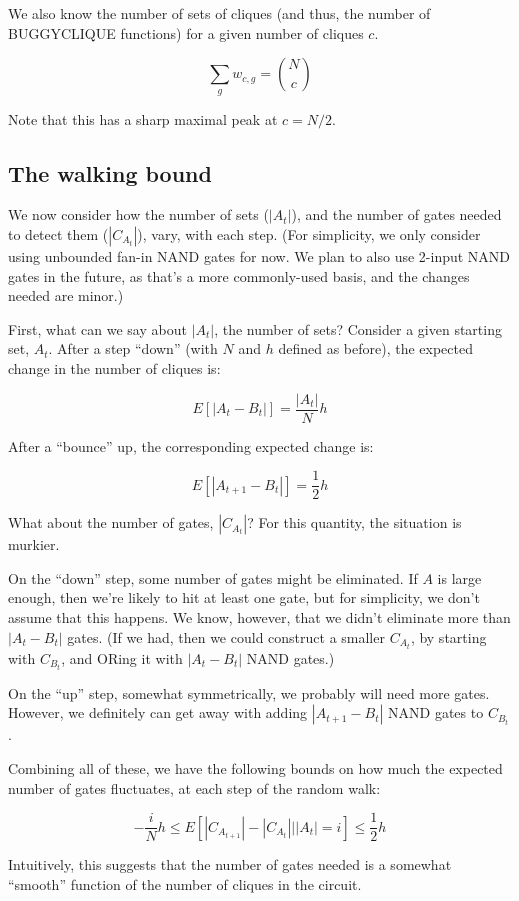 \documentclass[12pt]{article}
\theoremstyle{definition}
\begin{document}
We also know the number of sets of cliques (and thus, the number
of BUGGYCLIQUE functions) for a given number of cliques $c$.

\[
\sum_g w_{c,g} = {N \choose c}
\]

Note that this has a sharp maximal peak at $c = N/2$.

\subsection{The walking bound}

We now consider how the number of sets ($|A_t|$), and
the number of gates needed to detect them ($|C_{A_t}|$),
vary, with each step. (For simplicity, we only consider
using unbounded fan-in NAND gates for now. We plan to
also use 2-input NAND gates in the future, as that's a
more commonly-used basis, and the changes needed are minor.)

First, what can we say about $|A_t|$, the number of sets?
Consider a given starting set, $A_t$.
After a step ``down'' (with $N$ and $h$ defined as before),
the expected change in the number of cliques is:

\[
E[|A_t - B_t|] = \frac{|A_t|}{N}h
\]

After a ``bounce'' up, the corresponding expected change is:

\[
E[|A_{t+1} - B_t|] = \frac{1}{2}h
\]

What about the number of gates, $|C_{A_t}|$? For this quantity,
the situation is murkier.

On the ``down'' step, some number of gates might be eliminated.
If $A$ is large enough, then we're likely to hit at least one gate,
but for simplicity, we don't assume that this happens.
We know, however, that we didn't eliminate more than $|A_t - B_t|$
gates. (If we had, then we could construct a smaller $C_{A_t}$,
by starting with $C_{B_t}$, and ORing it with $|A_t - B_t|$
NAND gates.)

On the ``up'' step, somewhat symmetrically, we probably will
need more gates. However, we definitely can get away with
adding $|A_{t+1} - B_t|$ NAND gates to $C_{B_t}$.

Combining all of these, we have the following bounds on how much the
expected number of gates fluctuates, at each step of the random walk:

\[
-\frac{i}{N}h \le E[ |C_{A_{t+1}}| - |C_{A_t}| | |A_t|=i ] \le \frac{1}{2}h
\]

Intuitively, this suggests that the number
of gates needed is a somewhat ``smooth'' function of the
number of cliques in the circuit.
\end{document}
